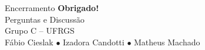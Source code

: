 \documentclass[aspectratio=169, 10pt]{beamer}
\begin{document}
\begin{frame}{Encerramento}
    \centering
    \vspace{2em}
    {\Huge\color{mainblue}\textbf{Obrigado!}}\\[1em]
    {\large\color{gray}Perguntas e Discuss\~{a}o}\\[2em]
    \normalsize
    Grupo C -- UFRGS\\
    F\'{a}bio Cieslak $\bullet$ Izadora Candotti $\bullet$ Matheus Machado
\end{frame}
\end{document}
